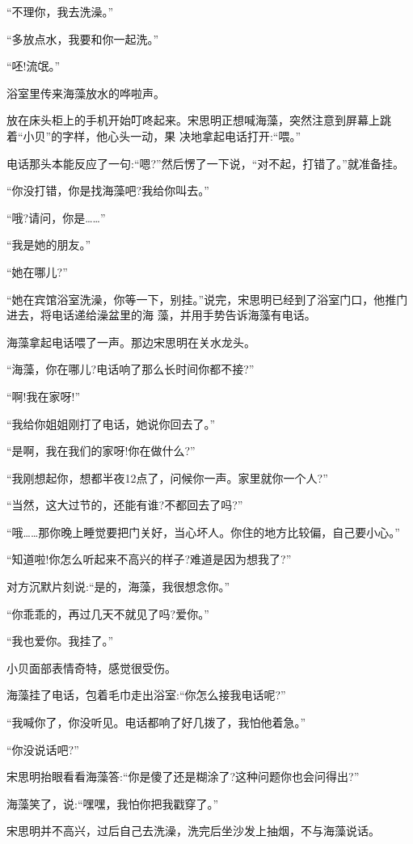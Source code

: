 \documentclass[11pt,a4paper,onecolumn]{article}
\begin{document}
``不理你，我去洗澡。''

``多放点水，我要和你一起洗。''

``呸!流氓。''

浴室里传来海藻放水的哗啦声。

放在床头柜上的手机开始叮咚起来。宋思明正想喊海藻，突然注意到屏幕上跳着``小贝''的字样，他心头一动，果
决地拿起电话打开:``喂。''

电话那头本能反应了一句:``嗯?''然后愣了一下说，``对不起，打错了。''就准备挂。

``你没打错，你是找海藻吧?我给你叫去。''

``哦?请问，你是……''

``我是她的朋友。''

``她在哪儿?''

``她在宾馆浴室洗澡，你等一下，别挂。''说完，宋思明已经到了浴室门口，他推门进去，将电话递给澡盆里的海
藻，并用手势告诉海藻有电话。

海藻拿起电话喂了一声。那边宋思明在关水龙头。

``海藻，你在哪儿?电话响了那么长时间你都不接?''

``啊!我在家呀!''

``我给你姐姐刚打了电话，她说你回去了。''

``是啊，我在我们的家呀!你在做什么?''

``我刚想起你，想都半夜12点了，问候你一声。家里就你一个人?''

``当然，这大过节的，还能有谁?不都回去了吗?''

``哦……那你晚上睡觉要把门关好，当心坏人。你住的地方比较偏，自己要小心。''

``知道啦!你怎么听起来不高兴的样子?难道是因为想我了?''

对方沉默片刻说:``是的，海藻，我很想念你。''

``你乖乖的，再过几天不就见了吗?爱你。''

``我也爱你。我挂了。''

小贝面部表情奇特，感觉很受伤。

海藻挂了电话，包着毛巾走出浴室:``你怎么接我电话呢?''

``我喊你了，你没听见。电话都响了好几拨了，我怕他着急。''

``你没说话吧?''

宋思明抬眼看看海藻答:``你是傻了还是糊涂了?这种问题你也会问得出?''

海藻笑了，说:``嘿嘿，我怕你把我戳穿了。''

宋思明并不高兴，过后自己去洗澡，洗完后坐沙发上抽烟，不与海藻说话。
\end{document}

